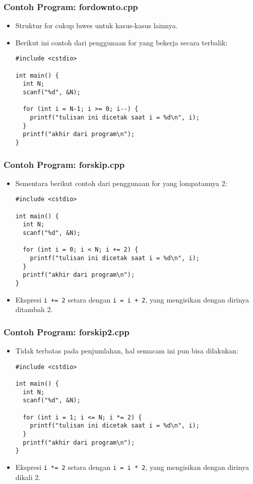 \begin{frame}[fragile]
\frametitle{Contoh Program: fordownto.cpp}
\begin{itemize}
  \item Struktur for cukup luwes untuk kasus-kasus lainnya.
  \item Berikut ini contoh dari penggunaan for yang bekerja secara terbalik:
\begin{lstlisting}
#include <cstdio>

int main() {
  int N;
  scanf("%d", &N);

  for (int i = N-1; i >= 0; i--) {
    printf("tulisan ini dicetak saat i = %d\n", i);
  }
  printf("akhir dari program\n");
}
\end{lstlisting}
\end{itemize}
\end{frame}

\begin{frame}[fragile]
\frametitle{Contoh Program: forskip.cpp}
\begin{itemize}
  \item Sementara berikut contoh dari penggunaan for yang lompatannya 2:
\begin{lstlisting}
#include <cstdio>

int main() {
  int N;
  scanf("%d", &N);

  for (int i = 0; i < N; i += 2) {
    printf("tulisan ini dicetak saat i = %d\n", i);
  }
  printf("akhir dari program\n");
}
\end{lstlisting}
  \item Ekspresi \texttt{i += 2} setara dengan \texttt{i = i + 2}, yang mengisikan  dengan dirinya ditambah 2.
\end{itemize}
\end{frame}

\begin{frame}[fragile]
\frametitle{Contoh Program: forskip2.cpp}
\begin{itemize}
  \item Tidak terbatas pada penjumlahan, hal semacam ini pun bisa dilakukan:
\begin{lstlisting}
#include <cstdio>

int main() {
  int N;
  scanf("%d", &N);

  for (int i = 1; i <= N; i *= 2) {
    printf("tulisan ini dicetak saat i = %d\n", i);
  }
  printf("akhir dari program\n");
}
\end{lstlisting}
  \item Ekspresi \texttt{i *= 2} setara dengan \texttt{i = i * 2}, yang mengisikan  dengan dirinya dikali 2.
\end{itemize}
\end{frame}


